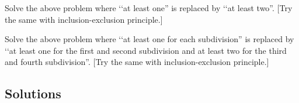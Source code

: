 \begin{ex}
Solve the above problem where \lq\lq at least one'' is replaced by
\lq\lq at least two''. [Try the same with inclusion-exclusion
principle.]
\end{ex}

\begin{ex}
Solve the above problem where \lq\lq at least one for each subdivision'' 
is replaced by
\lq\lq at least one for the first and second subdivision
and at least two for the third and fourth subdivision''. 
[Try the same with inclusion-exclusion
principle.]
\end{ex}

\newpage
\subsection*{Solutions}
